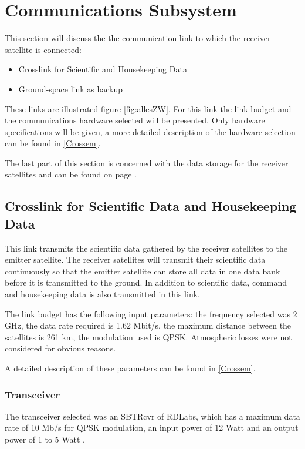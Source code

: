 \section{Communications Subsystem}
\label{sec:comm_receiver}
This section will discuss the  the communication link to which the receiver satellite is connected:
\begin{itemize}
\item Crosslink for Scientific and Housekeeping Data
\item Ground-space link as backup
\end{itemize}

These links are illustrated figure \ref{fig:allesZW}.
For this link the link budget and the communications hardware selected will be presented. Only hardware specifications will be given, a more detailed description of the hardware selection can be found in \ref{Crossem}.

The last part of this section is concerned with the data storage for the receiver satellites and can be found on page \pageref{DSReceiver}.

\subsection{Crosslink for Scientific Data and Housekeeping Data}
This link transmits the scientific data gathered by the receiver satellites to the emitter satellite. The receiver satellites will transmit their scientific data continuously so that the emitter satellite can store all data in one data bank before it is transmitted to the ground. In addition to scientific data, command and housekeeping data is also transmitted in this link.

The link budget has the following input parameters: the frequency selected was 2 GHz, the data rate required is 1.62 Mbit/s, the maximum distance between the satellites is 261 km, the modulation used is QPSK. Atmospheric losses were not considered for obvious reasons.

A detailed description of these parameters can be found in \ref{Crossem}.

\subsubsection{Transceiver}
The transceiver selected was an SBTRcvr of RDLabs, which has a maximum data rate of 10 Mb/s for QPSK modulation, an input power of 12 Watt and an output power of 1 to 5 Watt \cite{RDLabs}.

